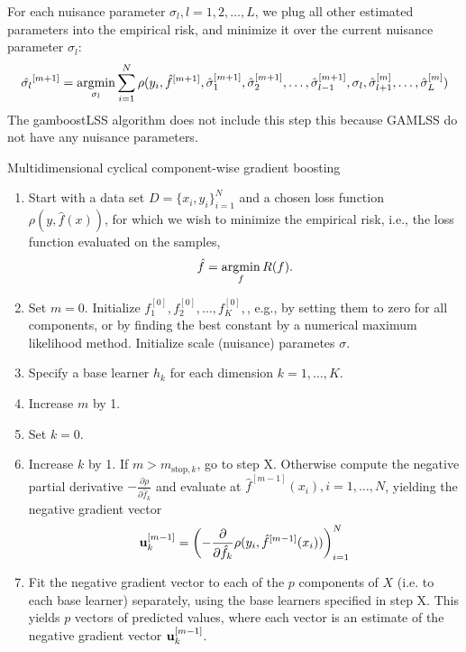 For each nuisance parameter $\sigma_l, l=1,2,\ldots,L$, we plug all other estimated parameters into the empirical risk, and minimize it over the current nuisance parameter $\sigma_l$:
\begin{equation}
    \hat{\sigma_l}^{[m+1]}=\operatorname*{argmin}_{\sigma_l} \sum_{i=1}^N \rho(y_i,\hat{f}^{[m+1]},\hat{\sigma}_1^{[m+1]},\hat{\sigma}_2^{[m+1]},\ldots,
    \hat{\sigma}_{l-1}^{[m+1]},\sigma_l,\hat{\sigma}_{l+1}^{[m]},\ldots,\hat{\sigma}_L^{[m]})
\end{equation}
The gamboostLSS algorithm \citep{gamboostLSS} does not include this step this because GAMLSS do not have any nuisance parameters.
\begin{algorithm}
\caption{Multidimensional cyclical component-wise gradient boosting}
\label{algo:multi-cyclical}
\begin{enumerate}
    \item Start with a data set $D=\{x_i, y_i\}_{i=1}^N$ and a chosen loss function $\rho(y,\hat{f}(x))$, for which we wish to
        minimize the empirical risk, i.e., the loss function evaluated on the samples,
        \begin{equation}
            \hat{f}=\operatorname*{argmin}_{f}R(f).
        \end{equation}
    \item Set $m=0$. Initialize $f^{[0]}_1,f^{[0]}_2,\ldots,f^{[0]}_K,$, e.g., by setting them to zero for all components, or by finding the best constant by a numerical maximum likelihood method. Initialize scale (nuisance) parametes $\sigma$.
    \item Specify a base learner $h_k$ for each dimension $k=1,\ldots,K$.
    \item Increase $m$ by 1.
    \item Set $k=0$.
    \item Increase $k$ by 1. If $m>m_{\text{stop},k}$, go to step X. Otherwise compute the negative partial derivative
        $-\frac{\partial\rho}{\partial \hat{f}_k}$ and evaluate at $\hat{f}^{[m-1]}(x_i),i=1,\ldots,N$, yielding the
        negative gradient vector
        \begin{equation}
            \mathbf{u}^{[m-1]}_k=\left(-\frac{\partial}{\partial \hat{f}_k}\rho(y_i, \hat{f}^{[m-1]}(x_i))\right)_{i=1}^N
        \end{equation}
    \item Fit the negative gradient vector to each of the $p$ components of $X$ (i.e. to each base learner) separately, using the base learners specified in step X. This yields $p$ vectors of predicted values, where each vector is an estimate of the negative gradient vector $\mathbf{u}^{[m-1]}_k$.

\end{enumerate}
\end{algorithm}
